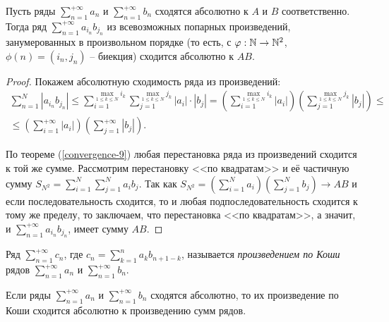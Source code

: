 \begin{theorem}[Коши]
    Пусть ряды $\sum_{n = 1}^{+\infty} a_n$ и $\sum_{n = 1}^{+\infty} b_n$ сходятся абсолютно к $A$ и $B$ соответственно. Тогда ряд $\sum_{n = 1}^{+\infty} a_{i_n} b_{j_n}$ из всевозможных попарных произведений, занумерованных в произвольном порядке (то есть, с $\varphi : \mathbb{N} \rightarrow \mathbb{N}^2$, $\phi(n) = (i_n, j_n)$ -- биекция) сходится абсолютно к $AB$.

    \begin{proof}
        Покажем абсолютную сходимость ряда из произведений:
        \begin{gather*}
            \sum_{n = 1}^N |a_{i_n} b_{j_n}| \le \sum_{i = 1}^{\max_{1 \le k \le N} i_k} \sum_{j = 1}^{\max_{1 \le k \le N} j_k} |a_i| \cdot |b_j| = \left(\sum_{i = 1}^{\max_{1 \le k \le N} i_k} |a_i|\right)\left(\sum_{j = 1}^{\max_{1 \le k \le N} j_k} |b_j|\right) \le\\\le \left(\sum_{i = 1}^{+\infty} |a_i|\right)\left(\sum_{j = 1}^{+\infty} |b_j|\right).
        \end{gather*}

        По теореме (\ref{convergence-9}) любая перестановка ряда из произведений сходится к той же сумме. Рассмотрим перестановку <<по квадратам>> и её частичную сумму $S_{N^2} = \sum_{i = 1}^N \sum_{j = 1}^N a_i b_j$. Так как $S_{N^2} = \left(\sum_{i = 1}^N a_i\right)\left(\sum_{j = 1}^N b_j\right) \rightarrow AB$ и если последовательность сходится, то и любая подпоследовательность сходится к тому же пределу, то заключаем, что перестановка <<по квадратам>>, а значит, и $\sum_{n = 1}^{+\infty} a_{i_n} b_{j_n}$, имеет сумму $AB$.
    \end{proof}
\end{theorem}

\begin{definition}
    Ряд $\sum_{n = 1}^{+\infty} c_n$, где $c_n = \sum_{k = 1}^n a_k b_{n + 1 - k}$, называется \emph{произведением по Коши} рядов $\sum_{n = 1}^{+\infty} a_n$ и $\sum_{n = 1}^{+\infty} b_n$.
\end{definition}

\begin{note}
    Если ряды $\sum_{n = 1}^{+\infty} a_n$ и $\sum_{n = 1}^{+\infty} b_n$ сходятся абсолютно, то их произведение по Коши сходится абсолютно к произведению сумм рядов.
\end{note}